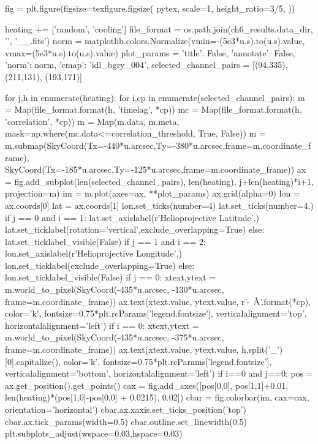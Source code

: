 \begin{pycode}
fig = plt.figure(figsize=texfigure.figsize(
    pytex,
    scale=1,
    height_ratio=3/5,
))

heating += ['random', 'cooling']
file_format = os.path.join(ch6_results.data_dir, '{}', '{}_{}_{}.fits')
norm = matplotlib.colors.Normalize(vmin=-(5e3*u.s).to(u.s).value,
                                   vmax=(5e3*u.s).to(u.s).value)
plot_params = { 'title': False, 'annotate': False, 'norm': norm, 'cmap': 'idl_bgry_004',}
selected_channel_pairs = [(94,335), (211,131), (193,171)]

for j,h in enumerate(heating):
    for i,cp in enumerate(selected_channel_pairs):
        m = Map(file_format.format(h, 'timelag', *cp))
        mc = Map(file_format.format(h, 'correlation', *cp))
        m = Map(m.data, m.meta, mask=np.where(mc.data<=correlation_threshold, True, False))
        m = m.submap(SkyCoord(Tx=-440*u.arcsec,Ty=-380*u.arcsec,frame=m.coordinate_frame),
                     SkyCoord(Tx=-185*u.arcsec,Ty=-125*u.arcsec,frame=m.coordinate_frame))
        ax = fig.add_subplot(len(selected_channel_pairs), len(heating), j+len(heating)*i+1,
                             projection=m)
        im = m.plot(axes=ax, **plot_params)
        ax.grid(alpha=0)
        lon = ax.coords[0]
        lat = ax.coords[1]
        lon.set_ticks(number=4)
        lat.set_ticks(number=4,) 
        if j == 0 and i == 1:
            lat.set_axislabel(r'Helioprojective Latitude',)
            lat.set_ticklabel(rotation='vertical',exclude_overlapping=True)
        else:
            lat.set_ticklabel_visible(False)
        if j == 1 and i == 2:
            lon.set_axislabel(r'Helioprojective Longitude',)
            lon.set_ticklabel(exclude_overlapping=True)
        else:
            lon.set_ticklabel_visible(False)
        if j == 0:
            xtext,ytext = m.world_to_pixel(SkyCoord(-435*u.arcsec, -130*u.arcsec, frame=m.coordinate_frame))
            ax.text(xtext.value, ytext.value, r'{}-{} $\si{{\angstrom}}$'.format(*cp),
                    color='k', fontsize=0.75*plt.rcParams['legend.fontsize'],
                    verticalalignment='top', horizontalalignment='left')
        if i == 0:
            xtext,ytext = m.world_to_pixel(SkyCoord(-435*u.arcsec, -375*u.arcsec, frame=m.coordinate_frame))
            ax.text(xtext.value, ytext.value, h.split('_')[0].capitalize(),
                    color='k', fontsize=0.75*plt.rcParams['legend.fontsize'],
                    verticalalignment='bottom', horizontalalignment='left')
        if i==0 and j==0:
            pos = ax.get_position().get_points()
            cax = fig.add_axes([pos[0,0], pos[1,1]+0.01, len(heating)*(pos[1,0]-pos[0,0] + 0.0215), 0.02])
            cbar = fig.colorbar(im, cax=cax, orientation='horizontal')
            cbar.ax.xaxis.set_ticks_position('top')
            cbar.ax.tick_params(width=0.5)
            cbar.outline.set_linewidth(0.5)
plt.subplots_adjust(wspace=0.03,hspace=0.03)


\end{pycode}
